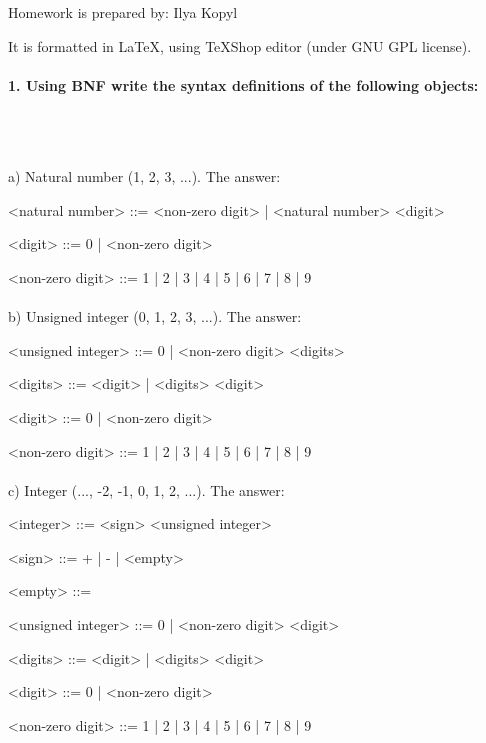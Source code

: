 \documentclass{article}
\begin{document}
Homework is prepared by: Ilya Kopyl

It is formatted in LaTeX, using TeXShop editor (under GNU GPL license).


	\setlength{\grammarparsep}{5pt plus 1pt minus 1pt} %
	\setlength{\grammarindent}{12em} %


	\paragraph{1. Using BNF write the syntax definitions of the following objects:}\
	\rmfamily\\\
	
			a) Natural number (1, 2, 3, ...). The answer:
	\ttfamily
	\begin{grammar}
	
		<natural number> ::= <non-zero digit> | <natural number> <digit>

		<digit> ::= 0 | <non-zero digit>

		<non-zero digit> ::= 1 | 2 | 3 | 4 | 5 | 6 | 7 | 8 | 9
		
	\end{grammar}
	
	
	\paragraph{}
	\rmfamily
	
			b) Unsigned integer (0, 1, 2, 3, ...). The answer:
	\ttfamily
	\begin{grammar}
		
		<unsigned integer> ::= 0 | <non-zero digit> <digits>
		
		<digits> ::= <digit> | <digits> <digit>

		<digit> ::= 0 | <non-zero digit>

		<non-zero digit> ::= 1 | 2 | 3 | 4 | 5 | 6 | 7 | 8 | 9
		
	\end{grammar}


	\paragraph{}
	\rmfamily
	
			c) Integer (..., -2, -1, 0, 1, 2, ...). The answer:
	\ttfamily
	\begin{grammar}
		
		<integer> ::= <sign> <unsigned integer>
		
		<sign> ::= + | - | <empty>
		
		<empty> ::= \
		
		<unsigned integer> ::= 0 | <non-zero digit> <digit>
				
		<digits> ::= <digit> | <digits> <digit>

		<digit> ::= 0 | <non-zero digit>
		
		<non-zero digit> ::= 1 | 2 | 3 | 4 | 5 | 6 | 7 | 8 | 9

		
	\end{grammar}
\end{document}
